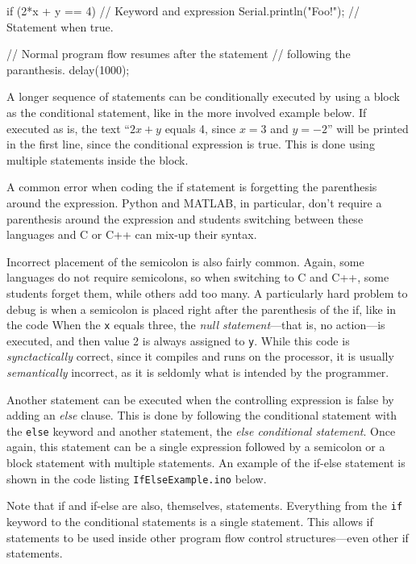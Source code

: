\begin{inocode}
if (2*x + y == 4)        // Keyword and expression
  Serial.println("Foo!"); // Statement when true.

// Normal program flow resumes after the statement
// following the paranthesis.
delay(1000);
\end{inocode}

A longer sequence of statements can be conditionally executed by using a block as the conditional statement, like in the more involved example below.
If executed as is, the text ``$2x + y$ equals 4, since $x=3$ and $y=-2$'' will be printed in the first line, since the conditional expression is true.
This is done using multiple statements inside the block.


A common error when coding the if statement is forgetting the parenthesis around the expression.
Python and MATLAB, in particular, don't require a parenthesis around the expression and students switching between these languages and C or C++ can mix-up their syntax.

Incorrect placement of the semicolon is also fairly common.
Again, some languages do not require semicolons, so when switching to C and C++, some students forget them, while others add too many.
A particularly hard problem to debug is when a semicolon is placed right after the parenthesis of the if, like in the code 
When the \texttt{x} equals three, the \emph{null statement}---that is, no action---is executed, and then value 2 is always assigned to \texttt{y}.
While this code is \emph{synctactically} correct, since it compiles and runs on the processor, it is usually \emph{semantically} incorrect, as it is seldomly what is intended by the programmer.

Another statement can be executed when the controlling expression is false by adding an \emph{else} clause.
This is done by following the conditional statement with the \texttt{else} keyword and another statement, the \emph{else conditional statement}.
Once again, this statement can be a single expression followed by a semicolon or a block statement with multiple statements.
An example of the if-else statement is shown in the code listing \texttt{IfElseExample.ino} below.


Note that if and if-else are also, themselves, statements.
Everything from the \texttt{if} keyword to the conditional statements is a single statement.
This allows if statements to be used inside other program flow control structures---even other if statements.


